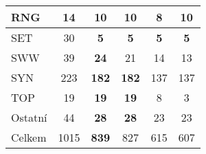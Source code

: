 \begin{longtable}{l|c|c|c|c|c}
\hline
{\footnotesize RNG} & {\footnotesize 14} & \textbf{10} & \textbf{10} & {\footnotesize 8} & \textbf{10}\\
\hline
{\footnotesize SET} & {\footnotesize 30} & \textbf{5} & \textbf{5} & \textbf{5} & \textbf{5}\\
\hline
{\footnotesize SWW} & {\footnotesize 39} & \textbf{24} & {\footnotesize 21} & {\footnotesize 14} & {\footnotesize 13}\\
\hline
{\footnotesize SYN} & {\footnotesize 223} & \textbf{182} & \textbf{182} & {\footnotesize 137} & {\footnotesize 137}\\
\hline
{\footnotesize TOP} & {\footnotesize 19} & \textbf{19} & \textbf{19} & {\footnotesize 8} & {\footnotesize 3}\\
\hline
{\footnotesize Ostatní} & {\footnotesize 44} & \textbf{28} & \textbf{28} & {\footnotesize 23} & {\footnotesize 23}\\
\hline
\hline
{\footnotesize Celkem} & {\footnotesize 1015} & \textbf{839} & {\footnotesize 827} & {\footnotesize 615} & {\footnotesize 607}\\
\hline
\end{longtable}
